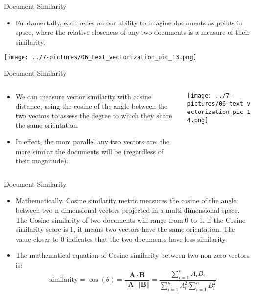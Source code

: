 \documentclass[11pt]{beamer}
\begin{document}
\begin{frame}{Document Similarity}
	\begin{itemize}
		\item Fundamentally, each relies on our ability to imagine documents as points in space, where the relative closeness of any two documents is a measure of their similarity.
	\end{itemize}
	\begin{center}
	\texttt{[image: ../7-pictures/06\_text\_vectorization\_pic\_13.png]}
	\end{center}
\end{frame}
\begin{frame}{Document Similarity}
\begin{columns}[T] %
\begin{column}{.48\textwidth}
        \begin{itemize}
		\item We can measure vector similarity with cosine distance, using the cosine of the angle between the two vectors to assess the degree to which they share the same orientation. 
		\item In effect, the more parallel any two vectors are, the more similar the documents will be (regardless of their magnitude).
        \end{itemize}
\end{column}%
\hfill%
\begin{column}{.48\textwidth}
        \texttt{[image: ../7-pictures/06\_text\_vectorization\_pic\_14.png]}
\end{column}%
\end{columns}
\end{frame}
\begin{frame}{Document Similarity}
	\begin{itemize}
		\item Mathematically, Cosine similarity metric measures the cosine of the angle between two n-dimensional vectors projected in a multi-dimensional space. The Cosine similarity of two documents will range from 0 to 1. If the Cosine similarity score is 1, it means two vectors have the same orientation. The value closer to 0 indicates that the two documents have less similarity.
		\item The mathematical equation of Cosine similarity between two non-zero vectors is: \begin{equation} \text{similarity} = \cos(\theta) = \frac{\mathbf{A} \cdot \mathbf{B}}{\left\Vert\mathbf{A}\right\Vert \,\left\Vert\mathbf{B}\right\Vert} = \frac{\sum\limits_{i=1}^n A_iB_i}{\sum\limits_{i=1}^n A_i^2 \sum\limits_{i=1}^n B_i^2} \end{equation}
	\end{itemize}
\end{frame}
\end{document}
